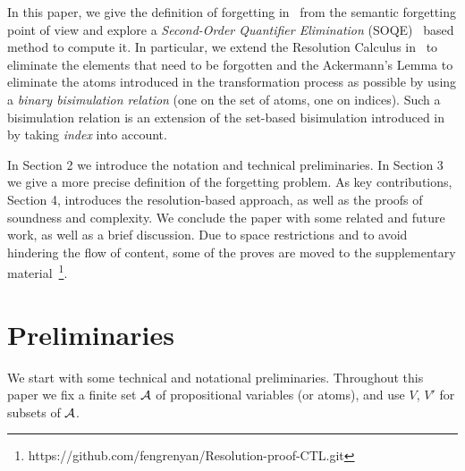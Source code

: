 \documentclass[letterpaper]{article}
\begin{document}
In this paper, we give the definition of forgetting in \CTL\ from the semantic forgetting point of view and explore a \emph{Second-Order Quantifier Elimination} (SOQE)~\cite{gabbay2008second} based method to compute it. In particular, we extend the Resolution Calculus in~\cite{zhang2014resolution} to eliminate the elements that need to be forgotten and the Ackermann's Lemma to 
 eliminate the atoms introduced in the transformation process as possible %
by using a \emph{binary bisimulation relation} (one on the set of atoms, one on indices).
Such a bisimulation relation is an extension of the set-based bisimulation introduced in \cite{renyansfirstpaper} by taking \emph{index} into account.

In Section 2 we introduce the notation and technical preliminaries.
In Section 3 we give a more precise definition of the forgetting problem.
As key contributions, Section 4, introduces the resolution-based approach, as well as the proofs of soundness and complexity.
We conclude the paper with some related and future work, as well as a brief discussion. Due to space restrictions and to avoid hindering the flow of content, some of the proves are moved to the supplementary material~\footnote{https://github.com/fengrenyan/Resolution-proof-CTL.git}.

\section{Preliminaries}
We start with some technical and notational preliminaries. Throughout this paper we fix a finite set ${\cal A}$ of propositional variables (or atoms), and use $V$, $V'$ for subsets of ${\cal A}$.
\end{document}
